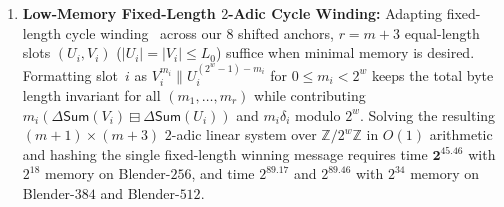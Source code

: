 \documentclass[11pt,a4paper]{article}
\theoremstyle{definition}
\theoremstyle{remark}
\newcommand{\Zmod}[1]{\mathbb{Z}/2^{#1}\mathbb{Z}}
\newcommand{\SumAcc}{\mathsf{Sum}}
\begin{document}
\begin{enumerate}[leftmargin=2em]
\begin{itemize}[leftmargin=1.5em]
        \item \textbf{Blender-$384$ ($B = 444$ bits, $\ell = 14, L_0 = 2^{20}$):} Total time $\mathbf{2^{66.34}}$, single-list size $2^{29.60}$, and message length $2^{38.91}$ words, compared to $2^{200.58}$ in~\cite{LM09} and $\ge 2^{171.9}$ in~\cite{Kli09}.
        \item \textbf{Blender-$512$ ($B = 570$ bits, $\ell = 14, L_0 = 2^{20}$):} Total time $\mathbf{2^{67.64}}$, single-list size $2^{38.00}$, and message length $2^{39.25}$ words, compared to $2^{265.00}$ in~\cite{LM09} and $\ge 2^{204.3}$ in~\cite{Kli09}.
    \end{itemize}
    \item \textbf{Low-Memory Fixed-Length $2$-Adic Cycle Winding:} Adapting fixed-length cycle winding~\cite{Kli09} across our $8$ shifted anchors, $r = m + 3$ equal-length slots $(U_i, V_i)$ ($|U_i| = |V_i| \le L_0$) suffice when minimal memory is desired. Formatting slot~$i$ as $V_i^{m_i} \| U_i^{(2^w - 1) - m_i}$ for $0 \le m_i < 2^w$ keeps the total byte length invariant for all $(m_1, \dots, m_r)$ while contributing $m_i(\Delta\SumAcc(V_i) \boxminus \Delta\SumAcc(U_i))$ and $m_i \delta_i$ modulo $2^w$. Solving the resulting $(m+1) \times (m+3)$ $2$-adic linear system over $\Zmod{w}$ in $O(1)$ arithmetic and hashing the single fixed-length winning message requires time $\mathbf{2^{45.46}}$ with $2^{18}$ memory on Blender-$256$, and time $2^{89.17}$ and $2^{89.46}$ with $2^{34}$ memory on Blender-$384$ and Blender-$512$.
\end{enumerate}
\end{document}
